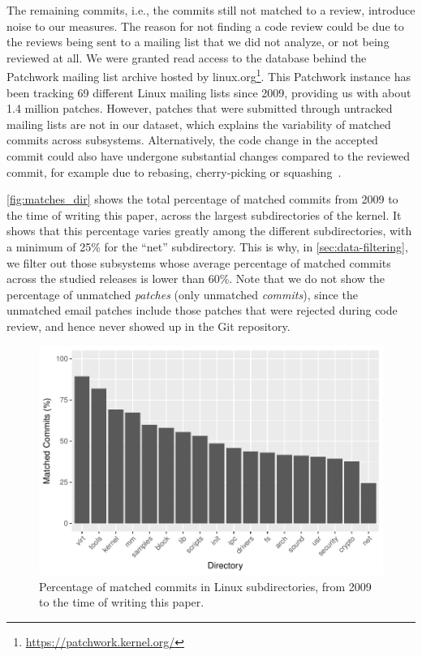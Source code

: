 The remaining commits, i.e., the commits still not matched to a review, introduce noise to our measures. The reason for not finding a code review could be due to the reviews being sent to a mailing list that we did not analyze, or not being reviewed at all. We were granted read access to the database behind the Patchwork mailing list archive hosted by linux.org\footnote{\url{https://patchwork.kernel.org/}}. This Patchwork instance has been tracking 69 different Linux mailing lists since 2009, providing us with about 1.4 million patches. However, patches that were submitted through untracked mailing lists are not in our dataset, which explains the variability of matched commits across subsystems. Alternatively, the code change in the accepted commit could also have undergone substantial changes compared to the reviewed commit, for example due to rebasing, cherry-picking or squashing~\cite{Bird-2009}.

\autoref{fig:matches_dir} shows the total percentage of matched commits from 2009 to the time of writing this paper, across the largest subdirectories of the kernel. It shows that this percentage varies greatly among the different subdirectories, with a minimum of 25\% for the ``net'' subdirectory. This is why, in \autoref{sec:data-filtering}, we filter out those subsystems whose average percentage of matched commits across the studied releases is lower than 60\%. Note that we do not show the percentage of unmatched {\em patches} (only unmatched {\em commits}), since the unmatched email patches include those patches that were rejected during code review, and hence never showed up in the Git repository.






% 

\begin{figure}[t]
  \centering
  \includegraphics[scale=.6]{plots/matched_commits_dir}
  \caption{Percentage of matched commits in Linux subdirectories, from 2009 to the time of writing this paper.}
  \label{fig:matches_dir}
\end{figure}



